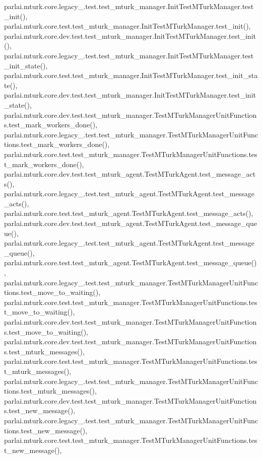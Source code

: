 parlai.\+mturk.\+core.\+legacy\+\_.\+test.\+test\+\_\+mturk\+\_\+manager.\+Init\+Test\+M\+Turk\+Manager.\+test\+\_\+init(), parlai.\+mturk.\+core.\+test.\+test\+\_\+mturk\+\_\+manager.\+Init\+Test\+M\+Turk\+Manager.\+test\+\_\+init(), parlai.\+mturk.\+core.\+dev.\+test.\+test\+\_\+mturk\+\_\+manager.\+Init\+Test\+M\+Turk\+Manager.\+test\+\_\+init(), parlai.\+mturk.\+core.\+legacy\+\_.\+test.\+test\+\_\+mturk\+\_\+manager.\+Init\+Test\+M\+Turk\+Manager.\+test\+\_\+init\+\_\+state(), parlai.\+mturk.\+core.\+test.\+test\+\_\+mturk\+\_\+manager.\+Init\+Test\+M\+Turk\+Manager.\+test\+\_\+init\+\_\+state(), parlai.\+mturk.\+core.\+dev.\+test.\+test\+\_\+mturk\+\_\+manager.\+Init\+Test\+M\+Turk\+Manager.\+test\+\_\+init\+\_\+state(), parlai.\+mturk.\+core.\+dev.\+test.\+test\+\_\+mturk\+\_\+manager.\+Test\+M\+Turk\+Manager\+Unit\+Functions.\+test\+\_\+mark\+\_\+workers\+\_\+done(), parlai.\+mturk.\+core.\+legacy\+\_.\+test.\+test\+\_\+mturk\+\_\+manager.\+Test\+M\+Turk\+Manager\+Unit\+Functions.\+test\+\_\+mark\+\_\+workers\+\_\+done(), parlai.\+mturk.\+core.\+test.\+test\+\_\+mturk\+\_\+manager.\+Test\+M\+Turk\+Manager\+Unit\+Functions.\+test\+\_\+mark\+\_\+workers\+\_\+done(), parlai.\+mturk.\+core.\+dev.\+test.\+test\+\_\+mturk\+\_\+agent.\+Test\+M\+Turk\+Agent.\+test\+\_\+message\+\_\+acts(), parlai.\+mturk.\+core.\+legacy\+\_.\+test.\+test\+\_\+mturk\+\_\+agent.\+Test\+M\+Turk\+Agent.\+test\+\_\+message\+\_\+acts(), parlai.\+mturk.\+core.\+test.\+test\+\_\+mturk\+\_\+agent.\+Test\+M\+Turk\+Agent.\+test\+\_\+message\+\_\+acts(), parlai.\+mturk.\+core.\+dev.\+test.\+test\+\_\+mturk\+\_\+agent.\+Test\+M\+Turk\+Agent.\+test\+\_\+message\+\_\+queue(), parlai.\+mturk.\+core.\+legacy\+\_.\+test.\+test\+\_\+mturk\+\_\+agent.\+Test\+M\+Turk\+Agent.\+test\+\_\+message\+\_\+queue(), parlai.\+mturk.\+core.\+test.\+test\+\_\+mturk\+\_\+agent.\+Test\+M\+Turk\+Agent.\+test\+\_\+message\+\_\+queue(), parlai.\+mturk.\+core.\+legacy\+\_.\+test.\+test\+\_\+mturk\+\_\+manager.\+Test\+M\+Turk\+Manager\+Unit\+Functions.\+test\+\_\+move\+\_\+to\+\_\+waiting(), parlai.\+mturk.\+core.\+test.\+test\+\_\+mturk\+\_\+manager.\+Test\+M\+Turk\+Manager\+Unit\+Functions.\+test\+\_\+move\+\_\+to\+\_\+waiting(), parlai.\+mturk.\+core.\+dev.\+test.\+test\+\_\+mturk\+\_\+manager.\+Test\+M\+Turk\+Manager\+Unit\+Functions.\+test\+\_\+move\+\_\+to\+\_\+waiting(), parlai.\+mturk.\+core.\+dev.\+test.\+test\+\_\+mturk\+\_\+manager.\+Test\+M\+Turk\+Manager\+Unit\+Functions.\+test\+\_\+mturk\+\_\+messages(), parlai.\+mturk.\+core.\+test.\+test\+\_\+mturk\+\_\+manager.\+Test\+M\+Turk\+Manager\+Unit\+Functions.\+test\+\_\+mturk\+\_\+messages(), parlai.\+mturk.\+core.\+legacy\+\_.\+test.\+test\+\_\+mturk\+\_\+manager.\+Test\+M\+Turk\+Manager\+Unit\+Functions.\+test\+\_\+mturk\+\_\+messages(), parlai.\+mturk.\+core.\+dev.\+test.\+test\+\_\+mturk\+\_\+manager.\+Test\+M\+Turk\+Manager\+Unit\+Functions.\+test\+\_\+new\+\_\+message(), parlai.\+mturk.\+core.\+legacy\+\_.\+test.\+test\+\_\+mturk\+\_\+manager.\+Test\+M\+Turk\+Manager\+Unit\+Functions.\+test\+\_\+new\+\_\+message(), parlai.\+mturk.\+core.\+test.\+test\+\_\+mturk\+\_\+manager.\+Test\+M\+Turk\+Manager\+Unit\+Functions.\+test\+\_\+new\+\_\+message(), 